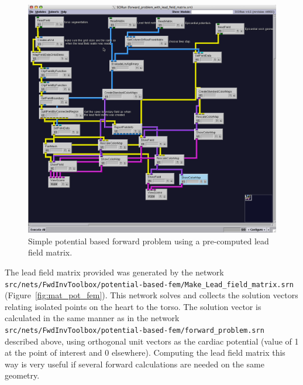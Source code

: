 \begin{figure}[H]
\begin{center}
\includegraphics[width=\textwidth]{ECGToolkitGuide_figures/potential_forward_fem_with_leadfield.png}
\caption{Simple potential based forward problem using a pre-computed lead field matrix.}
\label{fig:pot_for_fem_w_mat}
\end{center}
\end{figure}

The lead field matrix provided was generated by the network \newline
{\tt src/nets/FwdInvToolbox/potential-based-fem/Make\_Lead\_field\_matrix.srn} (Figure~\ref{fig:mat_pot_fem}).
This network solves and collects the solution vectors relating isolated points on the heart to the torso. The solution vector is calculated in the same manner as in the network \newline
{\tt src/nets/FwdInvToolbox/potential-based-fem/forward\_problem.srn} described above, using orthogonal unit vectors as the cardiac potential (value of 1 at the point of interest and 0 elsewhere). Computing the lead field matrix this way is very useful if several forward calculations are needed on the same geometry.

